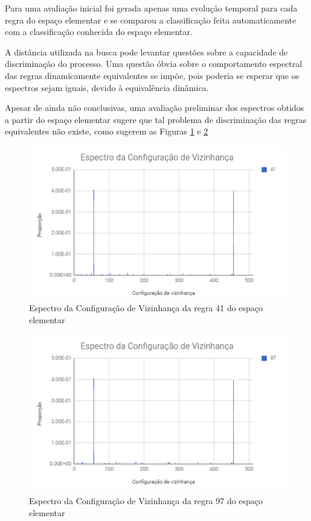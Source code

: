 \documentclass[12pt,a4paper]{report}
\begin{document}
	Para uma avaliação inicial foi gerada apenas uma evolução temporal para cada regra do espaço elementar e se comparou a classificação feita automaticamente com a classificação conhecida do espaço elementar. 
	
	A distância utilizada na busca pode levantar questões sobre a capacidade de discriminação do processo. Uma questão óbvia sobre o comportamento espectral das regras dinamicamente equivalentes se impõe, pois poderia se esperar que os espectros sejam iguais, devido à equivalência dinâmica.
	
	Apesar de ainda não conclusivas, uma avaliação preliminar dos espectros obtidos a partir do espaço elementar sugere que tal problema de discriminação das regras equivalentes não existe, como sugerem as Figuras \ref{fig:EspectroRegra41} e \ref{fig:EspectroRegra97}
	
	\begin{figure}[H]
		\centering
		\includegraphics[scale=0.75]{./img/espectro_regra_41.png}
		\caption{Espectro da Configuração de Vizinhança da regra 41 do espaço elementar}
		\label{fig:EspectroRegra41}
	\end{figure}
	
	\begin{figure}[H]
		\centering
		\includegraphics[scale=0.75]{./img/espectro_regra_97.png}
		\caption{Espectro da Configuração de Vizinhança da regra 97 do espaço elementar}
		\label{fig:EspectroRegra97}
	\end{figure}
	
\end{document}
